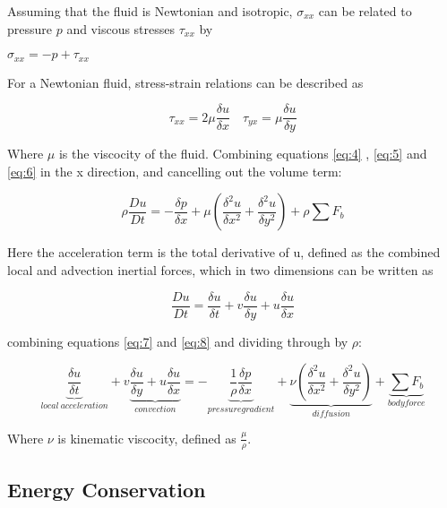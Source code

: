     Assuming that the fluid is Newtonian and isotropic, $\sigma_{xx}$ can be related to pressure $p$ and viscous stresses $\tau_{xx}$ by

    \centerline{$\sigma_{xx} = -p + \tau_{xx}$}

    For a Newtonian fluid, stress-strain relations can be described as 

    \begin{equation} \label{eq:6}
      \tau_{xx} = 2 \mu \frac{\delta u}{\delta x} \quad \tau_{yx} = \mu \frac{\delta u}{\delta y}
    \end{equation}

    Where $\mu$ is the viscocity of the fluid. Combining equations \ref{eq:4} , \ref{eq:5} and \ref{eq:6} in the x direction, and cancelling out the volume term:

    \begin{equation} \label{eq:7}
      \rho \frac{Du}{Dt} = - \frac{\delta p}{\delta x} + \mu (\frac{\delta^2 u}{\delta x^2} + \frac{\delta^2 u}{\delta y^2}) + \rho \sum F_{b}
    \end{equation}
    
    Here the acceleration term is the total derivative of u, defined as the combined local and advection inertial forces, which in two dimensions can be written as

    \begin{equation} \label{eq:8}
      \frac{Du}{Dt} = \frac{\delta u}{\delta t} + v \frac{\delta u}{\delta y} + u \frac{\delta u}{\delta x}
    \end{equation}

    combining equations \ref{eq:7} and \ref{eq:8} and dividing through by $\rho$:

    \begin{equation} \label{eq:9}
      \underbrace{\frac{\delta u}{\delta t}}_{local\ acceleration} + v \underbrace{\frac{\delta u}{\delta y} + u \frac{\delta u}{\delta x}}_{convection} = - \underbrace{\frac{1}{\rho} \frac{\delta p}{\delta x}}_{pressure gradient} + \underbrace{\nu (\frac{\delta^2 u}{\delta x^2} + \frac{\delta^2 u}{\delta y^2})}_{diffusion} + \underbrace{\sum F_{b}}_{body force}
    \end{equation}

    Where $\nu$ is kinematic viscocity, defined as $\frac{\mu}{\rho}$. 

    \subsection{Energy Conservation}

